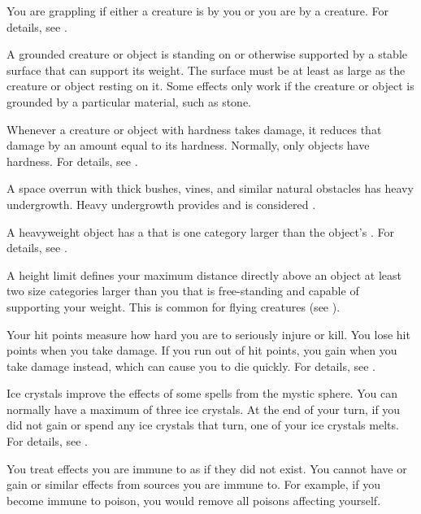  You are grappling if either a creature is \grappled by you or you are \grappled by a creature.
For details, see .

 A grounded creature or object is standing on or otherwise supported by a stable surface that can support its weight.
The surface must be at least as large as the creature or object resting on it.
Some effects only work if the creature or object is grounded by a particular material, such as stone.

 Whenever a creature or object with hardness takes damage, it reduces that damage by an amount equal to its hardness.
Normally, only objects have hardness.
For details, see .

 A space overrun with thick bushes, vines, and similar natural obstacles has heavy undergrowth.
Heavy undergrowth provides  and is considered .

 A heavyweight object has a  that is one category larger than the object's .
For details, see .

 A height limit defines your maximum distance directly above an object at least two size categories larger than you that is free-standing and capable of supporting your weight.
This is common for flying creatures (see ).

 Your hit points measure how hard you are to seriously injure or kill.
You lose hit points when you take damage.
If you run out of hit points, you gain  when you take damage instead, which can cause you to die quickly.
For details, see .

 Ice crystals improve the effects of some spells from the  mystic sphere.
You can normally have a maximum of three ice crystals.
At the end of your turn, if you did not gain or spend any ice crystals that turn, one of your ice crystals melts.
For details, see .

 You treat effects you are immune to as if they did not exist.
You cannot have or gain  or similar effects from sources you are immune to.
For example, if you become immune to poison, you would remove all poisons affecting yourself.

